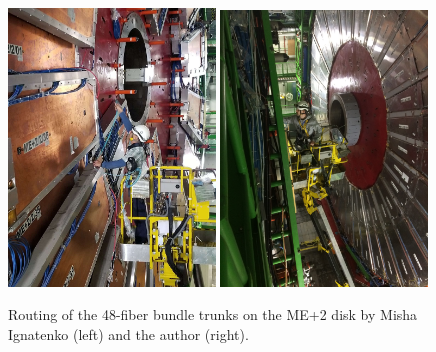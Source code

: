 \begin{figure}[H]
    \centering
    \includegraphics[width=0.49\textwidth]{Images/Phase2Upgrades/OpticalFibers/MishaRoutingFibers.jpeg}
    \includegraphics[width=0.49\textwidth,angle=270]{Images/Phase2Upgrades/OpticalFibers/GabrielRoutingFibers.jpg}
    \caption{Routing of the 48-fiber bundle trunks on the ME+2 disk by Misha Ignatenko (left) and the author (right).}
    \label{fig:MishaGabrielRoutingFibers}
\end{figure}